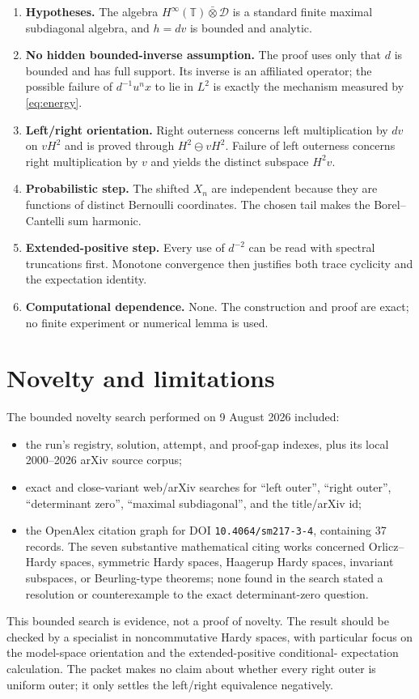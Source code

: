 \documentclass[11pt]{article}
\newcommand{\D}{\mathcal D}
\newcommand{\T}{\mathbb T}
\begin{document}
\begin{enumerate}[leftmargin=*]
\item \textbf{Hypotheses.}  The algebra
$H^\infty(\T)\bar\otimes\D$ is a standard finite maximal subdiagonal algebra,
and $h=dv$ is bounded and analytic.
\item \textbf{No hidden bounded-inverse assumption.}  The proof uses only that
$d$ is bounded and has full support.  Its inverse is an affiliated operator;
the possible failure of $d^{-1}u^nx$ to lie in $L^2$ is exactly the mechanism
measured by \eqref{eq:energy}.
\item \textbf{Left/right orientation.}  Right outerness concerns left
multiplication by $dv$ on $vH^2$ and is proved through
$H^2\ominus vH^2$.  Failure of left outerness concerns right multiplication
by $v$ and yields the distinct subspace $H^2v$.
\item \textbf{Probabilistic step.}  The shifted $X_n$ are independent because
they are functions of distinct Bernoulli coordinates.  The chosen tail makes
the Borel--Cantelli sum harmonic.
\item \textbf{Extended-positive step.}  Every use of $d^{-2}$ can be read with
spectral truncations first.  Monotone convergence then justifies both trace
cyclicity and the expectation identity.
\item \textbf{Computational dependence.}  None.  The construction and proof
are exact; no finite experiment or numerical lemma is used.
\end{enumerate}

\section{Novelty and limitations}

The bounded novelty search performed on 9 August 2026 included:
\begin{itemize}[leftmargin=*]
\item the run's registry, solution, attempt, and proof-gap indexes, plus its
local 2000--2026 arXiv source corpus;
\item exact and close-variant web/arXiv searches for ``left outer'', ``right
outer'', ``determinant zero'', ``maximal subdiagonal'', and the title/arXiv id;
\item the OpenAlex citation graph for DOI \texttt{10.4064/sm217-3-4}, containing
37 records.  The seven substantive mathematical citing works concerned
Orlicz--Hardy spaces, symmetric Hardy spaces, Haagerup Hardy spaces, invariant
subspaces, or Beurling-type theorems; none found in the search stated a
resolution or counterexample to the exact determinant-zero question.
\end{itemize}
This bounded search is evidence, not a proof of novelty.  The result should be
checked by a specialist in noncommutative Hardy spaces, with particular focus
on the model-space orientation and the extended-positive conditional-
expectation calculation.  The packet makes no claim about whether every right
outer is uniform outer; it only settles the left/right equivalence negatively.
\end{document}
